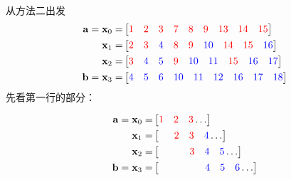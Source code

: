 \documentclass[aspectratio=169,10pt]{beamer}
\begin{document}
\begin{frame}[fragile,shrink=42]{从方法二出发}
\[
\begin{aligned}
\mathbf{a}=\mathbf{x}_0 =&
\begin{bmatrix}
{\color{red}1} & {\color{red}2} & {\color{red}3} &
{\color{red}7} & {\color{red}8} & {\color{red}9} &
{\color{red}13} & {\color{red}14} & {\color{red}15}
\end{bmatrix}
\\
\mathbf{x}_1 =&
\begin{bmatrix}
{\color{red}2} & {\color{red}3} & {\color{blue}4} &
{\color{red}8} & {\color{red}9} & {\color{blue}10} &
{\color{red}14} & {\color{red}15} & {\color{blue}16}
\end{bmatrix}
\\
\mathbf{x}_2 =&
\begin{bmatrix}
{\color{red}3} & {\color{blue}4} & {\color{blue}5} &
{\color{red}9} & {\color{blue}10} & {\color{blue}11} &
{\color{red}15} & {\color{blue}16} & {\color{blue}17}
\end{bmatrix}
\\
\mathbf{b}=\mathbf{x}_3 =&
\begin{bmatrix}
{\color{blue}4} & {\color{blue}5} & {\color{blue}6} &
{\color{blue}10} & {\color{blue}11} & {\color{blue}12} &
{\color{blue}16} & {\color{blue}17} & {\color{blue}18}
\end{bmatrix}
\end{aligned}
\]
先看第一行的部分：
\par
\[
\begin{aligned}
\mathbf{a}=\mathbf{x}_0 =&
\begin{bmatrix}
{\color{red}1} & {\color{red}2} & {\color{red}3}
\dots
\end{bmatrix}
\\
\mathbf{x}_1 =&
\begin{bmatrix}
&\;\;{\color{red}2} & {\color{red}3} & {\color{blue}4} 
\dots
\end{bmatrix}
\\
\mathbf{x}_2 =&
\begin{bmatrix}
&&\;\;\;\;{\color{red}3} & {\color{blue}4} & {\color{blue}5} 
\dots
\end{bmatrix}
\\
\mathbf{b}=\mathbf{x}_3 =&
\begin{bmatrix}
&&&\;\;\;\;\;\;{\color{blue}4} & {\color{blue}5} & {\color{blue}6} 
\dots
\end{bmatrix}

\end{aligned}\]
\end{frame}
\end{document}
